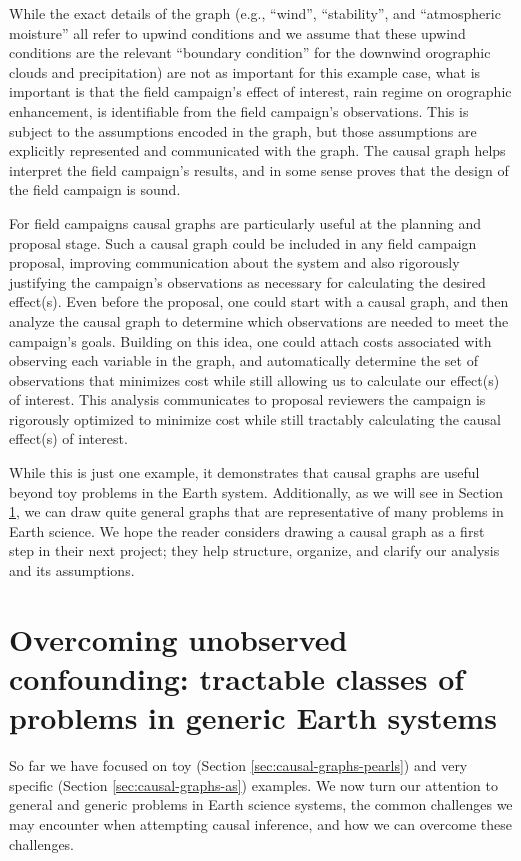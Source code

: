 \documentclass[12pt]{article}
\begin{document}
While the exact details of the graph (e.g., ``wind'', ``stability'',
and ``atmospheric moisture'' all refer to upwind conditions and we
assume that these upwind conditions are the relevant ``boundary
condition'' for the downwind orographic clouds and
precipitation) are not as important for this example case, what is
important is that the field campaign's effect of interest, rain regime
on orographic enhancement, is identifiable from the field campaign's
observations. This is subject to the assumptions encoded in the graph,
but those assumptions are explicitly represented and communicated with
the graph. The causal graph helps interpret the field campaign's
results, and in some sense proves that the design of the field
campaign is sound.

For field campaigns causal graphs are particularly useful at the
planning and proposal stage. Such a causal graph could be included in
any field campaign proposal, improving communication about the system
and also rigorously justifying the campaign’s observations as
necessary for calculating the desired effect(s). Even before the
proposal, one could start with a causal graph, and then analyze the
causal graph to determine which observations are needed to meet the
campaign’s goals. Building on this idea, one could attach costs
associated with observing each variable in the graph, and
automatically determine the set of observations that minimizes cost
while still allowing us to calculate our effect(s) of interest. This
analysis communicates to proposal reviewers the campaign is rigorously
optimized to minimize cost while still tractably calculating the
causal effect(s) of interest.

While this is just one example, it demonstrates that causal graphs are
useful beyond toy problems in the Earth system. Additionally, as we
will see in Section \ref{sec:necess-cond-caus}, we can draw quite
general graphs that are representative of many problems in Earth
science. We hope the reader considers drawing a causal graph as a
first step in their next project; they help structure, organize,
and clarify our analysis and its assumptions.


\section{Overcoming unobserved confounding: tractable classes of
  problems in generic Earth systems}
\label{sec:necess-cond-caus}

So far we have focused on toy (Section \ref{sec:causal-graphs-pearls})
and very specific (Section \ref{sec:causal-graphs-as}) examples. We
now turn our attention to general and generic problems in Earth
science systems, the common challenges we may encounter when
attempting causal inference, and how we can overcome these challenges.
\end{document}

